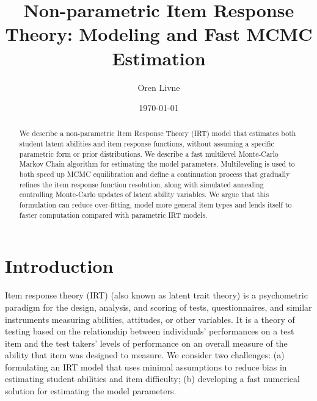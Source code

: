 \documentclass{article}
\title{Non-parametric Item Response Theory: Modeling and Fast MCMC Estimation}
\author[1]{Oren Livne}
\affil[1]{Educational Testing Service, 660 Rosedale Road, Attn: MS-12, T-197, Princeton, NJ 08540. Email: olivne@ets.org}
\date{\today}
\begin{document}
\maketitle

\begin{abstract}
We describe a non-parametric Item Response Theory (IRT) model that estimates both student latent abilities and item response functions, without assuming a specific parametric form or prior distributions. We describe a fast multilevel Monte-Carlo Markov Chain algorithm for estimating the model parameters. Multileveling is used to both speed up MCMC equilibration and define a continuation process that gradually refines the item response function resolution, along with simulated annealing controlling Monte-Carlo updates of latent ability variables. We argue that this formulation can reduce over-fitting, model more general item types and lends itself to faster computation compared with parametric IRT models.
\end{abstract}

\section{Introduction}
Item response theory (IRT) (also known as latent trait theory) is a psychometric paradigm for the design, analysis, and scoring of tests, questionnaires, and similar instruments measuring abilities, attitudes, or other variables. It is a theory of testing based on the relationship between individuals' performances on a test item and the test takers' levels of performance on an overall measure of the ability that item was designed to measure. We consider two challenges: (a) formulating an IRT model that uses minimal assumptions to reduce bias in estimating student abilities and item difficulty; (b) developing a fast numerical solution for estimating the model parameters.
\end{document}
